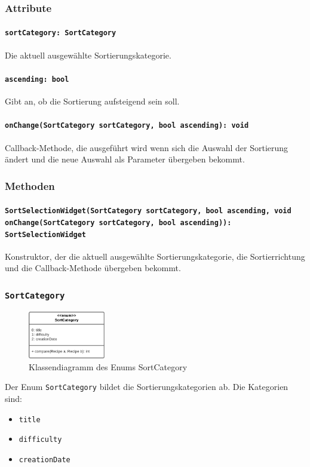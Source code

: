 \documentclass{entwurfsheft}
\begin{document}
\begin{sloppypar}
\subsubsection*{Attribute}
\paragraph{\texttt{sortCategory: SortCategory}}
Die aktuell ausgewählte Sortierungskategorie.
\paragraph{\texttt{ascending: bool}}
Gibt an, ob die Sortierung aufsteigend sein soll.
\paragraph{\texttt{onChange(SortCategory sortCategory, bool ascending): void}} Callback-Methode, die ausgeführt wird wenn sich die Auswahl der Sortierung ändert und die neue Auswahl als Parameter übergeben bekommt.
\subsubsection*{Methoden}
\paragraph{\texttt{SortSelectionWidget(SortCategory sortCategory, bool ascending, void onChange(SortCategory sortCategory, bool ascending)): SortSelectionWidget}}
Konstruktor, der die aktuell ausgewählte Sortierungskategorie, die Sortierrichtung und die Callback-Methode übergeben bekommt.
\newpage
\subsubsection{\texttt{SortCategory}}
\label{sec:sortCategory}
\begin{figure}
    [htp]
    \centering
    \includegraphics[width=0.3\textwidth]{images/presentationLayer/classDiagrams/sortCategory.pdf}
    \caption{Klassendiagramm des Enums Sort\-Category}
\end{figure}
Der Enum \texttt{SortCategory} bildet die Sortierungskategorien ab. Die Kategorien sind:
\begin{itemize}
    \item \texttt{title}
    \item \texttt{difficulty}
    \item \texttt{creationDate}
\end{itemize}

\end{sloppypar}
\end{document}
